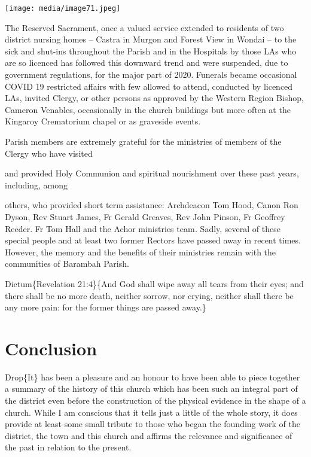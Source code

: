 \texttt{[image: media/image71.jpeg]}

The Reserved Sacrament, once a valued service extended to residents of two district nursing homes -- Castra in Murgon and Forest View in Wondai -- to the sick and shut-ins throughout the Parish and in the Hospitals by those LAs who are so licenced has followed this downward trend and were suspended, due to government regulations, for the major part of 2020. Funerals became occasional COVID 19 restricted affairs with few allowed to attend, conducted by licenced LAs, invited Clergy, or other persons as approved by the Western Region Bishop, Cameron Venables, occasionally in the church buildings but more often at the Kingaroy Crematorium chapel or as graveside events.

Parish members are extremely grateful for the ministries of members of the Clergy who have visited

and provided Holy Communion and spiritual nourishment over these past years, including, among

others, who provided short term assistance: Archdeacon Tom Hood, Canon Ron Dyson, Rev Stuart James, Fr Gerald Greaves, Rev John Pinson, Fr Geoffrey Reeder. Fr Tom Hall and the Achor ministries team\emph{.} Sadly, several of these special people and at least two former Rectors have passed away in recent times. However, the memory and the benefits of their ministries remain with the communities of Barambah Parish.

Dictum\{Revelation 21:4\}\{And God shall wipe away all tears from their eyes; and there shall be no more death, neither sorrow, nor crying, neither shall there be any more pain: for the former things are passed away.\}

\hypertarget{conclusion}{%
\chapter{Conclusion}\label{conclusion}}

Drop\{It\} has been a pleasure and an honour to have been able to piece together a summary of the history of this church which has been such an integral part of the district even before the construction of the physical evidence in the shape of a church. While I am conscious that it tells just a little of the whole story, it does provide at least some small tribute to those who began the founding work of the district, the town and this church and affirms the relevance and significance of the past in relation to the present.


